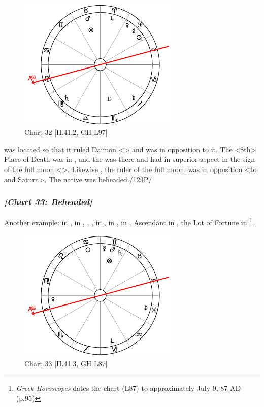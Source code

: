 \clearpage
\begin{figure}
\centering
\includegraphics[width=0.68\textwidth]{charts/2_41_2}
\caption{Chart 32 [II.41.2, GH L97]}
\label{fig:chart32}
\end{figure} 

\noindent \Mars\xspace was located so that it ruled Daimon <\Scorpio> and was in opposition to it. The <8th> Place of Death was in \Sagittarius, and the \Moon\xspace was there and had \Saturn\xspace in superior aspect in the sign of the full moon <\Virgo>. Likewise \Mercury, the ruler of the full moon, was in opposition <to \Virgo\xspace and Saturn>. The native was beheaded./123P/ 
\newpage
\subsubsection{\textit{[Chart 33: Beheaded]}}
Another example: \Sun\xspace in \Cancer, \Moon\xspace in \Pisces, \Saturn, \Mars, \Mercury\xspace in \Gemini, \Jupiter\xspace in \Capricorn, \Venus\xspace in \Leo, Ascendant in \Libra, the Lot of Fortune in \Gemini
\footnote{\textit{Greek Horoscopes} dates the chart (L87) to approximately July 9, 87 AD (p.95)}.

\clearpage
\begin{figure}
\centering
\includegraphics[width=0.68\textwidth]{charts/2_41_3}
\caption{Chart 33 [II.41.3, GH L87]}
\label{fig:chart33}
\end{figure} 

